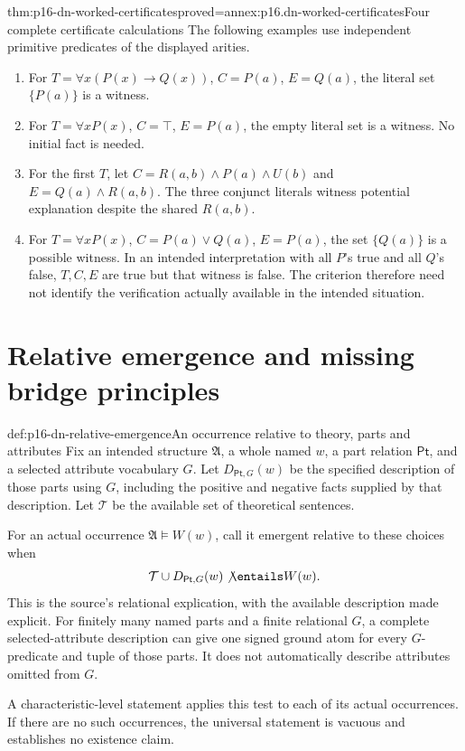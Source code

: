 \begin{hbtheorem}{thm:p16-dn-worked-certificates}{proved=annex:p16.dn-worked-certificates}{Four complete certificate calculations}
The following examples use independent primitive
predicates of the displayed arities.
\begin{enumerate}
\item For \(T=\forall x(P(x)\to Q(x))\),
      \(C=P(a)\), \(E=Q(a)\), the literal
      set \(\{P(a)\}\) is a witness.
\item For \(T=\forall xP(x)\), \(C=\top\),
      \(E=P(a)\), the empty literal set
      is a witness. No initial fact is needed.
\item For the first \(T\), let
      \(C=R(a,b)\land P(a)\land U(b)\) and
      \(E=Q(a)\land R(a,b)\).
      The three conjunct literals witness
      potential explanation despite the
      shared \(R(a,b)\).
\item For \(T=\forall xP(x)\),
      \(C=P(a)\lor Q(a)\), \(E=P(a)\),
      the set \(\{Q(a)\}\) is a possible
      witness. In an intended interpretation
      with all \(P\)'s true and all \(Q\)'s
      false, \(T,C,E\) are true but that
      witness is false. The criterion
      therefore need not identify the
      verification actually available
      in the intended situation.
\end{enumerate}
\end{hbtheorem}

\section{Relative emergence and missing bridge principles}
\label{sec:p16-dn-emergence}

\begin{hbdefinition}{def:p16-dn-relative-emergence}{An occurrence relative to theory, parts and attributes}
Fix an intended structure \(\mathfrak A\), a whole
named \(w\), a part relation \(\mathsf{Pt}\),
and a selected attribute vocabulary \(G\).
Let \(D_{\mathsf{Pt},G}(w)\) be the specified
description of those parts using \(G\), including
the positive and negative facts supplied by
that description. Let \(\mathcal T\) be the
available set of theoretical sentences.

For an actual occurrence
\(\mathfrak A\models W(w)\), call it emergent
relative to these choices when
\[
               \mathcal T\cup D_{\mathsf{Pt},G}(w)
                                      \not\entails W(w).
\]
This is the source's relational explication,
with the available description made explicit.
For finitely many named parts and a finite
relational \(G\), a complete selected-attribute
description can give one signed ground atom
for every \(G\)-predicate and tuple of those
parts. It does not automatically describe
attributes omitted from \(G\).

A characteristic-level statement applies this
test to each of its actual occurrences.
If there are no such occurrences, the universal
statement is vacuous and establishes no
existence claim.
\end{hbdefinition}

